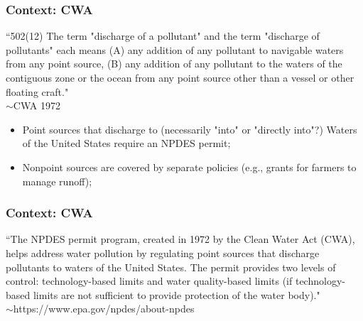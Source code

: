 \documentclass[aspectratio=169]{beamer}
\theoremstyle{principle}
\begin{document}
\begin{frame}
\frametitle{Context: CWA}

\begin{center}
``\large 502(12) The term "discharge of a pollutant" and the term "discharge of pollutants" each means (A) any addition of any pollutant to navigable waters from any point source, (B) any addition of any pollutant to the waters of the contiguous zone or the ocean from any point source other than a vessel or other floating craft."\\
\bigskip
\Large\hspace{100mm}$\sim$CWA 1972
\end{center}

\begin{itemize}
\item Point sources that discharge to (necessarily "into" or "directly into"?) Waters of the United States require an NPDES permit;
\bigskip
\item Nonpoint sources are covered by separate policies (e.g., grants for farmers to manage runoff);
\end{itemize}

\end{frame}

\begin{frame}
\frametitle{Context: CWA}

\begin{center}
\Large``The NPDES permit program, created in 1972 by the Clean Water Act (CWA), helps address water pollution by regulating point sources that discharge pollutants to waters of the United States. The permit provides two levels of control: technology-based limits and water quality-based limits (if technology-based limits are not sufficient to provide protection of the water body)."\\
\bigskip
\large\hspace{100mm}$\sim$https://www.epa.gov/npdes/about-npdes
\end{center}

\end{frame}
\end{document}
